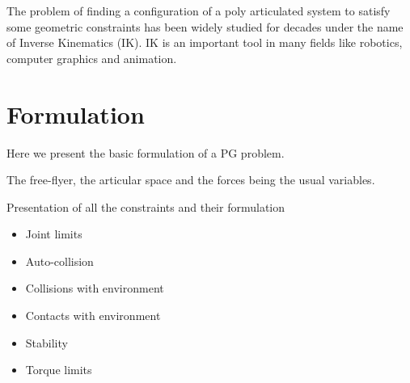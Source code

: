 The problem of finding a configuration of a poly articulated system to satisfy some geometric constraints has been widely studied for decades under the name of Inverse Kinematics (IK).
IK is an important tool in many fields like robotics, computer graphics and animation.





\section{Formulation}

Here we present the basic formulation of a PG problem.

The free-flyer, the articular space and the forces being the usual variables.

Presentation of all the constraints and their formulation
\begin{itemize}
  \item Joint limits
  \item Auto-collision
  \item Collisions with environment
  \item Contacts with environment
  \item Stability
  \item Torque limits
\end{itemize}

